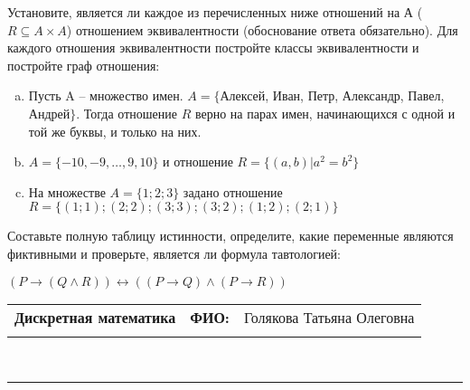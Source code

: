 \documentclass[10pt]{exam}
\newcommand{\class}{Дискретная математика}
\newcommand{\examdate}{}
\begin{document}
\begin{questions}
\question
Установите, является ли каждое из перечисленных ниже отношений на А ($R \subseteq A \times A$) отношением эквивалентности (обоснование ответа обязательно). Для каждого отношения эквивалентности постройте классы 
эквивалентности и постройте граф отношения:
\begin{enumerate} [a)]\setcounter{enumi}{0}
\item Пусть A – множество имен. $A = \{ $Алексей, Иван, Петр, Александр, Павел, Андрей$ \}$. Тогда отношение $R$ верно на парах имен, начинающихся с одной и той же буквы, и только на них.
\item $A = \{-10, -9, … , 9, 10\}$ и отношение $ R = \{(a,b)|a^{2} = b^{2}\}$
\item На множестве $A = \{1; 2; 3\}$ задано отношение $R = \{(1; 1); (2; 2); (3; 3); (3; 2); (1; 2); (2; 1)\}$
\end{enumerate}\question Составьте полную таблицу истинности, определите, какие переменные являются фиктивными и проверьте, является ли формула тавтологией:

$(P \rightarrow (Q \land R)) \leftrightarrow ((P \rightarrow Q) \land (P \rightarrow R))$

\end{questions}
\newpage
\begin{flushright}
\begin{tabular}{p{2.8in} r l}
\textbf{\class} & \textbf{ФИО:} &Голякова Татьяна Олеговна
\\

\textbf{\examdate} &&\\
\end{tabular}\\
\end{flushright}
\rule[1ex]{\textwidth}{.1pt}
\end{document}
